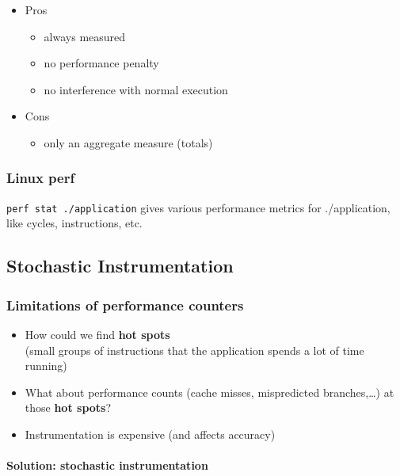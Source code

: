 \documentclass[12pt]{article}
\begin{document}
\begin{itemize}
  \item Pros
  \begin{itemize}
    \item always measured
    \item no performance penalty
    \item no interference with normal execution
  \end{itemize}
  \item Cons
  \begin{itemize}
    \item only an aggregate measure (totals)
  \end{itemize}
\end{itemize}

\subsubsection{Linux perf}

\texttt{perf stat ./application} gives various performance metrics for ./application, like cycles, instructions, etc. 

\subsection{Stochastic Instrumentation}

\subsubsection{Limitations of performance counters}

\begin{itemize}
    \item How could we find \textbf{hot spots}\\
    (small groups of instructions that the application spends a lot of time running)
    
    \item What about performance counts (cache misses, mispredicted branches,\ldots)
    at those \textbf{hot spots}?
    
    \item Instrumentation is expensive (and affects accuracy)
\end{itemize}

\paragraph{Solution: stochastic instrumentation}
\end{document}
